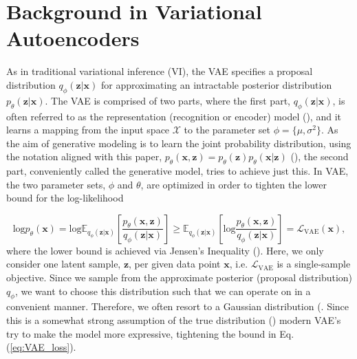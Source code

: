 \section{Background in Variational Autoencoders}
As in traditional variational inference (VI), the VAE specifies a proposal distribution $q_{\phi}(\bm z|\bm x)$ for approximating an intractable posterior distribution $p_{\theta}(\bm z|\bm x)$. The VAE is comprised of two parts, where the first part, $q_{\phi}(\bm z|\bm x)$, is often referred to as the representation (recognition or encoder) model (\cite{kingma2013autoencoding, tmc, iwae}), and it learns a mapping from the input space $\mathcal{X}$ to the parameter set $\phi = \{\mu, \sigma^2 \}$. As the aim of generative modeling is to learn the joint probability distribution, using the notation aligned with this paper, $p_{\theta}(\bm x, \bm z) = p_{\theta}(\bm z)p_{\theta}(\bm x| \bm z)$ (\cite{kingma2013autoencoding, kingma2018glow, kingma2019introduction}), the second part, conveniently called the generative model, tries to achieve just this. In VAE, the two parameter sets, $\phi$ and $\theta$, are optimized in order to tighten the lower bound for the log-likelihood

\begin{equation}
    \text{log} p_{\theta}(\bm x) = \text{log} \mathbb E_{q_{\phi}(\bm z|\bm x)} \left[\frac{p_{\theta}(\bm x, \bm z)}{q_{\phi}(\bm z|\bm x)}\right]
    \geq \mathbb E_{q_{\phi}(\bm z|\bm x)} \left[\text{log}\frac{p_{\theta}(\bm x, \bm z)}{q_{\phi}(\bm z|\bm x)}\right] = \mathcal{L}_{\text{VAE}}(\bm x),
\label{eq:VAE_loss}
\end{equation}
where the lower bound is achieved via Jensen's Inequality (\cite{kingma2013autoencoding}). Here, we only consider one latent sample, $\bm z$, per given data point $\bm x$, i.e. $\mathcal{L}_{\text{VAE}}$ is a single-sample objective. Since we sample from the approximate posterior (proposal distribution) $q_{\phi}$, we want to choose this distribution such that we can operate on in a convenient manner. Therefore, we often resort to a Gaussian distribution (\cite{iwae, kingma2013autoencoding,kingma2019introduction}. Since this is a somewhat strong assumption of the true distribution (\cite{kingma2018glow, rezende2015variational}) modern VAE's try to make the model more expressive, tightening the bound in Eq. (\ref{eq:VAE_loss}).


